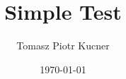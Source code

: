 \documentclass[aspectratio=169]{beamer}
\title[Simple Test]{Simple Test}
\author[TPK] {Tomasz Piotr Kucner}
\institute[Aalto Univeristy] %
{
    Aalto University
}
\date{\today} %
\begin{document}
\begin{frame}
    \titlepage
\end{frame}
\end{document}
